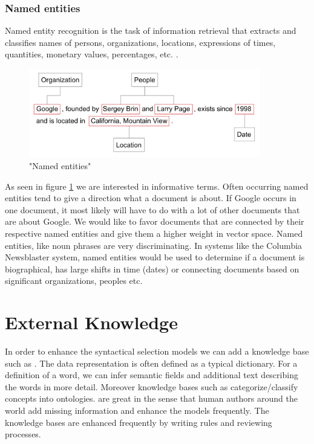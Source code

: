   \subsubsection*{Named entities}
  Named entity recognition is the task of information retrieval that extracts and classifies  names of persons, organizations, locations, expressions of times, quantities, monetary values, percentages, etc. \cite[chp. 22]{NLPBookJurafsky2000}. 

    \begin{figure}[h!]
      \centering
        \includegraphics[width=0.9\textwidth]{ner_tags.png}
        \caption{"Named entities"}
        \label{ner_tags}
    \end{figure} 

  As seen in figure \ref{ner_tags} we are interested in informative terms. Often occurring named entities tend to give a direction what a document is about. If Google occurs in one document, it most likely will have to do with a lot of other documents that are about Google. We would like to favor documents that are connected by their respective named entities and give them a higher weight in vector space. Named entities, like noun phrases are very discriminating. In systems like the Columbia Newsblaster system, named entities would be used to determine if a document is biographical, has large shifts in time (dates) or connecting documents based on significant organizations, peoples etc. \cite{ColumbiaMultiDoc2001}

\section{External Knowledge}
\label{sec:semantic_selection}

  In order to enhance the syntactical selection models we can add a knowledge base such as \wordwiki{}. The data representation is often defined as a typical dictionary. For a definition of a word, we can infer semantic fields and additional text describing the words in more detail. Moreover knowledge bases such as \wiki{} categorize/classify concepts into ontologies. \wordwiki{} are great in the sense that human authors around the world add missing information and enhance the models frequently. The knowledge bases are enhanced frequently by writing rules and reviewing processes.

